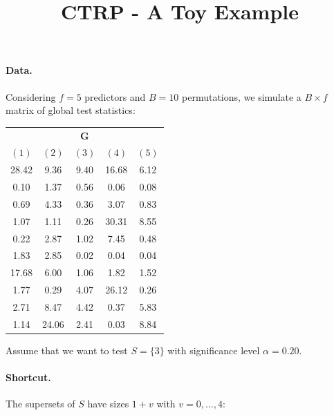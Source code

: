 \documentclass[11pt,a4paper,openright,twoside]{article}
\title{CTRP - A Toy Example}
\author{}
\date{}
\begin{document}
\maketitle

\paragraph{Data.} Considering $f=5$ predictors and $B=10$ permutations, we simulate a $B\times f$ matrix of global test statistics:

\begin{table}[h!]
\centering
\begin{tabular}{ccccc}
\multicolumn{5}{c}{$\mathbf{G}$}\\
$(1)$ & $(2)$ & $(3)$ & $(4)$ & $(5)$\\
\cline{1-5}
28.42 & 9.36 & 9.40 & 16.68 & 6.12\\
0.10 & 1.37 & 0.56 & 0.06 & 0.08\\
0.69 & 4.33 & 0.36 & 3.07 & 0.83\\
1.07 & 1.11 & 0.26 & 30.31 & 8.55\\
0.22 & 2.87 & 1.02 & 7.45 & 0.48\\
1.83 & 2.85 & 0.02 & 0.04 & 0.04\\
17.68 & 6.00 & 1.06 & 1.82 & 1.52\\
1.77 & 0.29 & 4.07 & 26.12 & 0.26\\
2.71 & 8.47 & 4.42 & 0.37 & 5.83\\
1.14 & 24.06 & 2.41 & 0.03 & 8.84
\end{tabular}
\end{table}

Assume that we want to test $S=\{3\}$ with significance level $\alpha=0.20$.




\vspace{5mm}
\paragraph{Shortcut.} The supersets of $S$ have sizes $1+v$ with $v=0,\ldots,4$:

\begin{table}[h!]
\centering
{}
\end{table}
\end{document}
